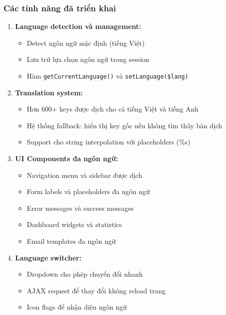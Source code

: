 \documentclass[12pt,a4paper]{report}
\begin{document}
\subsubsection{Các tính năng đã triển khai}
\begin{enumerate}
    \item \textbf{Language detection và management:}
    \begin{itemize}
        \item Detect ngôn ngữ mặc định (tiếng Việt)
        \item Lưu trữ lựa chọn ngôn ngữ trong session
        \item Hàm \texttt{getCurrentLanguage()} và \texttt{setLanguage(\$lang)}
    \end{itemize}
    
    \item \textbf{Translation system:}
    \begin{itemize}
        \item Hơn 600+ keys được dịch cho cả tiếng Việt và tiếng Anh
        \item Hệ thống fallback: hiển thị key gốc nếu không tìm thấy bản dịch
        \item Support cho string interpolation với placeholders (\%s)
    \end{itemize}
    
    \item \textbf{UI Components đa ngôn ngữ:}
    \begin{itemize}
        \item Navigation menu và sidebar được dịch
        \item Form labels và placeholders đa ngôn ngữ
        \item Error messages và success messages
        \item Dashboard widgets và statistics
        \item Email templates đa ngôn ngữ
    \end{itemize}
    
    \item \textbf{Language switcher:}
    \begin{itemize}
        \item Dropdown cho phép chuyển đổi nhanh
        \item AJAX request để thay đổi không reload trang
        \item Icon flags để nhận diện ngôn ngữ
    \end{itemize}
\end{enumerate}
\end{document}
